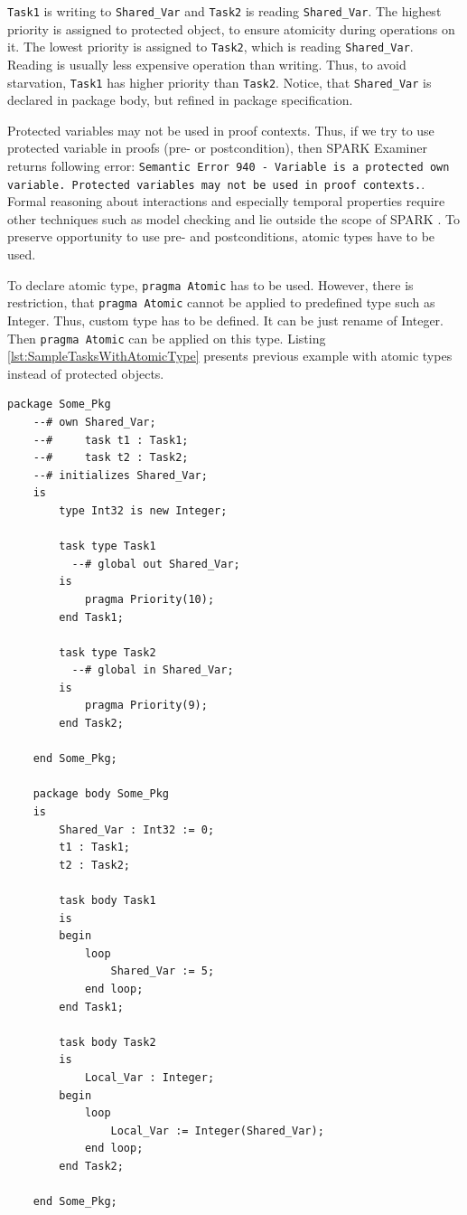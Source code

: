 \lstinline{Task1} is writing to \lstinline{Shared_Var} and \lstinline{Task2} is reading \lstinline{Shared_Var}. The highest priority is assigned to protected object, to ensure atomicity during operations on it. The lowest priority is assigned to \lstinline{Task2}, which is reading \lstinline{Shared_Var}. Reading is usually less expensive operation than writing. Thus, to avoid starvation, \lstinline{Task1} has higher priority than \lstinline{Task2}. Notice, that \lstinline{Shared_Var} is declared in package body, but refined in package specification.

Protected variables may not be used in proof contexts. Thus, if we try to use protected variable in proofs (pre- or postcondition), then SPARK Examiner returns following error: \lstinline{Semantic Error 940 - Variable is a protected own variable. Protected variables may not be used in proof contexts.}. Formal reasoning about interactions and especially temporal properties require other techniques such as model checking and lie outside the scope of SPARK \cite{Barnes:Book}. To preserve opportunity to use pre- and postconditions, atomic types have to be used.

To declare atomic type, \lstinline{pragma Atomic} has to be used. However, there is restriction, that \lstinline{pragma Atomic} cannot be applied to predefined type such as Integer. Thus, custom type has to be defined. It can be just rename of Integer. Then \lstinline{pragma Atomic} can be applied on this type. Listing \ref{lst:SampleTasksWithAtomicType} presents previous example with atomic types instead of protected objects.

\singlespacing
\begin{lstlisting}[frame=single, gobble=0, caption={Sample tasks with atomic type}, label={lst:SampleTasksWithAtomicType}]
	package Some_Pkg
	--# own Shared_Var;
	--#     task t1 : Task1;
	--#     task t2 : Task2;
	--# initializes Shared_Var;
	is
	    type Int32 is new Integer;
	    
	    task type Task1
	      --# global out Shared_Var;
	    is
	        pragma Priority(10);
	    end Task1;

	    task type Task2
	      --# global in Shared_Var;
	    is
	        pragma Priority(9);
	    end Task2;

	end Some_Pkg;

	package body Some_Pkg
	is    
	    Shared_Var : Int32 := 0;
	    t1 : Task1;
	    t2 : Task2;

	    task body Task1
	    is
	    begin
	        loop
	            Shared_Var := 5;
	        end loop;
	    end Task1;

	    task body Task2
	    is
	        Local_Var : Integer;
	    begin
	        loop
	            Local_Var := Integer(Shared_Var);
	        end loop;
	    end Task2;

	end Some_Pkg;
\end{lstlisting}
\doublespacing


